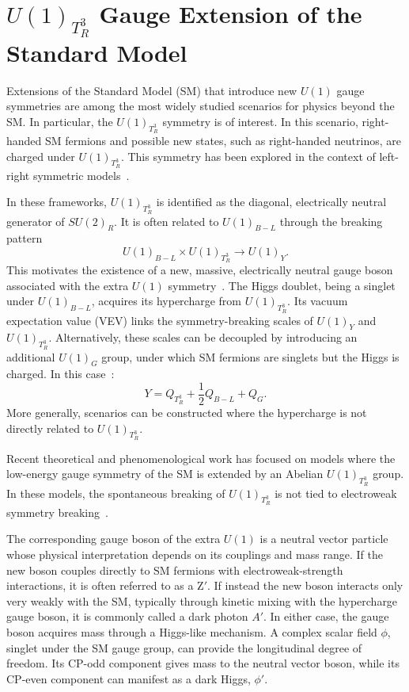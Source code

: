 \chapter{$U(1)_{T^3_R}$ Gauge Extension of the Standard Model}

Extensions of the Standard Model (SM) that introduce new $U(1)$ gauge symmetries are among the most widely studied scenarios for physics beyond the SM. In particular, the $U(1)_{T^3_R}$ symmetry is of interest. In this scenario, right-handed SM fermions and possible new states, such as right-handed neutrinos, are charged under $U(1)_{T^3_R}$. This symmetry has been explored in the context of left-right symmetric models~\parencite{Assad:2017iib, MohapatraPati1975, SenjanovicMohapatra1975}.

In these frameworks, $U(1)_{T^3_R}$ is identified as the diagonal, electrically neutral generator of $SU(2)_R$. It is often related to $U(1)_{B-L}$ through the breaking pattern 
\[
U(1)_{B-L} \times U(1)_{T^3_R} \rightarrow U(1)_Y.
\]
This motivates the existence of a new, massive, electrically neutral gauge boson associated with the extra $U(1)$ symmetry~\parencite{DiLuzio2018, Baker2019, Michaels:2020fzj, Dev:2021otb, Florez2023}. The Higgs doublet, being a singlet under $U(1)_{B-L}$, acquires its hypercharge from $U(1)_{T^3_R}$. Its vacuum expectation value (VEV) links the symmetry-breaking scales of $U(1)_Y$ and $U(1)_{T^3_R}$. Alternatively, these scales can be decoupled by introducing an additional $U(1)_G$ group, under which SM fermions are singlets but the Higgs is charged. In this case~\parencite{Dutta:2022qvn}:
\begin{equation}
Y=Q_{T^3_R}+\frac{1}{2}Q_{B-L} + Q_G.
\end{equation}
More generally, scenarios can be constructed where the hypercharge is not directly related to $U(1)_{T^3_R}$.

Recent theoretical and phenomenological work has focused on models where the low-energy gauge symmetry of the SM is extended by an Abelian $U(1)_{T^3_R}$ group. In these models, the spontaneous breaking of $U(1)_{T^3_R}$ is not tied to electroweak symmetry breaking~\parencite{Dutta2019, Dutta2020, Dutta2020b, Dutta2022, PhysRevD.107.095019, Dutta2023}.

The corresponding gauge boson of the extra $U(1)$ is a neutral vector particle whose physical interpretation depends on its couplings and mass range.  If the new boson couples directly to SM fermions with electroweak-strength interactions, it is often referred to as a $\textrm{Z}'$.  If instead the new boson interacts only very weakly with the SM, typically through kinetic mixing with the hypercharge gauge boson, it is commonly called a dark photon $A'$.  In either case, the gauge boson acquires mass through a Higgs-like mechanism. A complex scalar field $\phi$, singlet under the SM gauge group, can provide the longitudinal degree of freedom. Its CP-odd component gives mass to the neutral vector boson, while its CP-even component can manifest as a dark Higgs, $\phi'$.

